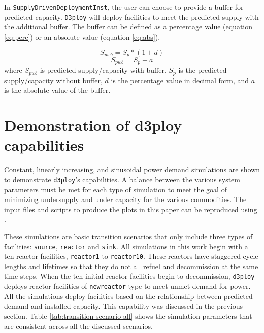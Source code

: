 \documentclass[11pt,letterpaper]{article}
\newcommand{\deploy}{\texttt{d3ploy}\xspace}%
\newcommand{\Deploy}{\texttt{D3ploy}\xspace}%
\begin{document}
In \texttt{SupplyDrivenDeploymentInst}, the user can choose to 
provide a buffer for predicted capacity.
\Deploy will deploy facilities to meet the predicted supply with the 
additional buffer. 
The buffer can be defined as a percentage value (equation \ref{eq:perc}) 
or an absolute value (equation \ref{eq:abs}).  

\begin{equation}
    \label{eq:perc}
    S_{pwb} = S_{p}*(1+d)
\end{equation}
\begin{equation}
    \label{eq:abs}
    S_{pwb} = S_{p}+a
\end{equation}
where $S_{pwb}$ is predicted supply/capacity with buffer, 
$S_p$ is the predicted supply/capacity without buffer, 
$d$ is the percentage value in decimal form, 
and $a$ is the absolute value of the buffer. 

\section{Demonstration of d3ploy capabilities}
Constant, linearly increasing, and sinusoidal power demand simulations
are shown to demonstrate \deploy's capabilities. 
A balance between the various system parameters must be 
met for each type of simulation to meet the goal of 
minimizing undersupply and under capacity for the various 
commodities. 
The input files and scripts to produce the plots in this paper 
can be reproduced using \cite{d3ploy_doi_2019}.

These simulations are basic transition scenarios that only include
three types of facilities: \texttt{source}, \texttt{reactor} and 
\texttt{sink}.
All simulations in this work begin with a ten reactor facilities, 
\texttt{reactor1} to \texttt{reactor10}. 
These reactors have staggered cycle lengths and lifetimes 
so that they do not all refuel and decommission at the same time 
steps. 
When the ten initial reactor facilities begin to decommission, 
\deploy deploys reactor facilities of \texttt{newreactor} type
to meet unmet demand for power. 
All the simulations deploy facilities based on the relationship
between predicted demand and installed capacity. 
This capability was discussed in the previous section.  
Table \ref{tab:transition-scenario-all} shows the simulation 
parameters that are consistent across all the discussed 
scenarios. 
\end{document}
